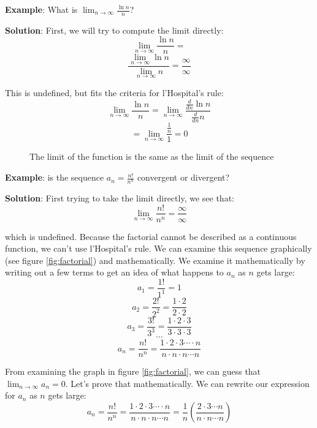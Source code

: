 \textbf{Example}: What is $\lim_{n \to \infty} \frac{\ln{n}}{n}$? 

\textbf{Solution}: First, we will try to compute the limit directly:
$$\lim_{n \to \infty} \frac{\ln{n}}{n} = $$
$$\frac{\lim_{n \to \infty} \ln{n}}{\lim_{n \to \infty}n} = 
\frac{\infty}{\infty}$$

This is undefined, but fits the criteria for l'Hospital's rule:
$$\lim_{n \to \infty} \frac{\ln{n}}{n} = \lim_{n \to \infty} 
\frac{\frac{d}{dn}\ln{n}}{\frac{d}{dn}n}$$
$$= \lim_{n \to \infty} \frac{\frac{1}{n}}{1} = 0$$

\begin{figure}[htbp]
\centering
    \caption{The limit of the function is the same as the limit of the sequence}
    \label{fig:limit}
\end{figure}

\textbf{Example}: is the sequence $a_n = \frac{n!}{n^n}$ convergent or divergent? 

\textbf{Solution}: First trying to take the limit directly, we see that:
$$\lim_{n \to \infty} \frac{n!}{n^n} = \frac{\infty}{\infty}$$

which is undefined. Because the factorial cannot be described as a continuous 
function, we can't use l'Hospital's rule. We can examine this sequence 
graphically (see figure \ref{fig:factorial}) and mathematically. We examine it 
mathematically by writing out a few terms to get an idea of what happens to 
$a_n$ as $n$ gets large:
$$a_1 = \frac{1!}{1^1} = 1$$
$$a_2 = \frac{2!}{2^2} = \frac{1 \cdot 2}{2 \cdot 2}$$
$$a_3 = \frac{3!}{3^3} = \frac{1 \cdot 2 \cdot 3}{3 \cdot 3 \cdot 3}$$
$$\cdots$$
$$a_n = \frac{n!}{n^n} = \frac{1 \cdot 2 \cdot 3 \cdots \cdot n}{n 
\cdot n \cdot n \cdots n}$$

From examining the graph in figure \ref{fig:factorial}, we can guess that 
$\lim_{n \to \infty} a_n = 0$. Let's prove that mathematically. We can rewrite 
our expression for $a_n$ as $n$ gets large:
$$a_n = \frac{n!}{n^n} = \frac{1 \cdot 2 \cdot 3 \cdots \cdot n}{n 
\cdot n \cdot n \cdots n} = \frac{1}{n}(\frac{2 \cdot 3 \cdots n}{n 
\cdot n \cdots n})$$

